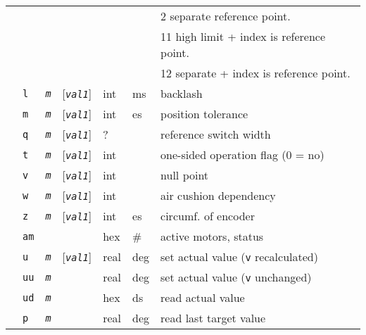 \documentclass[10pt]{article}
\newcommand{\ts}[1]{\texttt{\textsl{#1}}}
\newcommand{\<}{$<$}
\renewcommand{\>}{\/$>$}
\begin{document}
\begin{table}[b]
\begin{tabular}{l|lcl|lll}
  &            &      &                &     &        &   2  separate reference point.        \\
  &            &      &                &     &        &  11  high limit + index is reference point.\\
  &            &      &                &     &        &  12  separate + index is reference point.\\
  &\texttt{l}  &\ts{m}&[\ts{val1}]     & int & ms     & backlash                          \\
  &\texttt{m}  &\ts{m}&[\ts{val1}]     & int & es     & position tolerance                \\
  &\texttt{q}  &\ts{m}&[\ts{val1}]     & ?   &        & reference switch width            \\
  &\texttt{t}  &\ts{m}&[\ts{val1}]     & int &        & one-sided operation flag (0 = no) \\
  &\texttt{v}  &\ts{m}&[\ts{val1}]     & int &        & null point                        \\
  &\texttt{w}  &\ts{m}&[\ts{val1}]     & int &        & air cushion dependency            \\
  &\texttt{z}  &\ts{m}&[\ts{val1}]     & int & es     & circumf. of encoder               \\
              \hline
  &\texttt{am} &        &           & hex & \#   & active motors, status                          \\
  &\texttt{u}  & \ts{m} &[\ts{val1}]& real& deg  & set actual value (\texttt{v} recalculated)  \\
  &\texttt{uu} & \ts{m} &           & real& deg  & set actual value (\texttt{v} unchanged)     \\
  &\texttt{ud} & \ts{m} &           & hex & ds   & read actual value                           \\
  &\texttt{p}  & \ts{m} &           & real& deg  & read last target value                     \\

\end{tabular}
\end{table}
\end{document}
